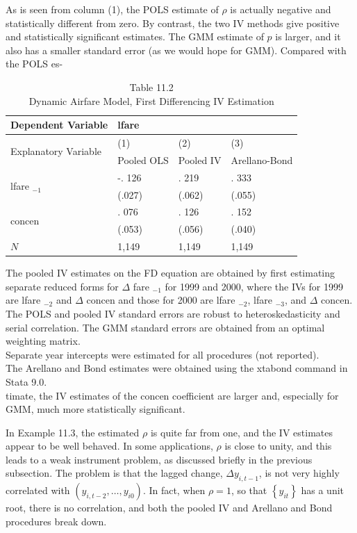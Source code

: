 \documentclass[10pt]{article}
\begin{document}
As is seen from column (1), the POLS estimate of $\rho$ is actually negative and statistically different from zero. By contrast, the two IV methods give positive and statistically significant estimates. The GMM estimate of $p$ is larger, and it also has a smaller standard error (as we would hope for GMM). Compared with the POLS es-

\begin{table}[h]
\begin{center}
\captionsetup{labelformat=empty}
\caption{Table 11.2\\
Dynamic Airfare Model, First Differencing IV Estimation}
\begin{tabular}{|l|l|l|l|}
\hline
Dependent Variable & \multicolumn{3}{|l|}{lfare} \\
\hline
\multirow[b]{2}{*}{Explanatory Variable} & (1) & (2) & (3) \\
\hline
 & Pooled OLS & Pooled IV & Arellano-Bond \\
\hline
\multirow[t]{2}{*}{lfare $_{-1}$} & -. 126 & . 219 & . 333 \\
\hline
 & (.027) & (.062) & (.055) \\
\hline
\multirow[t]{2}{*}{concen} & . 076 & . 126 & . 152 \\
\hline
 & (.053) & (.056) & (.040) \\
\hline
$N$ & 1,149 & 1,149 & 1,149 \\
\hline
\end{tabular}
\end{center}
\end{table}

The pooled IV estimates on the FD equation are obtained by first estimating separate reduced forms for $\Delta$ fare $_{-1}$ for 1999 and 2000, where the IVs for 1999 are lfare $_{-2}$ and $\Delta$ concen and those for 2000 are lfare $_{-2}$, lfare $_{-3}$, and $\Delta$ concen.\\
The POLS and pooled IV standard errors are robust to heteroskedasticity and serial correlation. The GMM standard errors are obtained from an optimal weighting matrix.\\
Separate year intercepts were estimated for all procedures (not reported).\\
The Arellano and Bond estimates were obtained using the xtabond command in Stata 9.0.\\
timate, the IV estimates of the concen coefficient are larger and, especially for GMM, much more statistically significant.

In Example 11.3, the estimated $\rho$ is quite far from one, and the IV estimates appear to be well behaved. In some applications, $\rho$ is close to unity, and this leads to a weak instrument problem, as discussed briefly in the previous subsection. The problem is that the lagged change, $\Delta y_{i, t-1}$, is not very highly correlated with $\left(y_{i, t-2}, \ldots, y_{i 0}\right)$. In fact, when $\rho=1$, so that $\left\{y_{i t}\right\}$ has a unit root, there is no correlation, and both the pooled IV and Arellano and Bond procedures break down.
\end{document}
